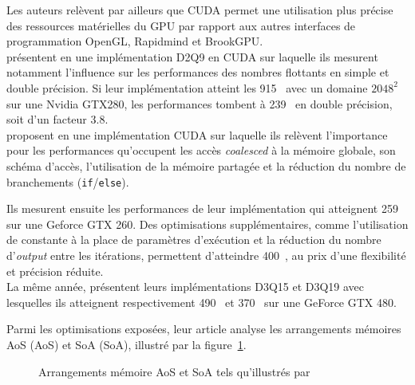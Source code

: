 Les auteurs relèvent par ailleurs que CUDA permet une utilisation plus précise des ressources matérielles du \acs{GPU} par rapport aux autres interfaces de programmation OpenGL, Rapidmind et BrookGPU.\\

\citet{kuznik_lbm_2010} présentent en \citeyear{kuznik_lbm_2010} une implémentation D2Q9 en CUDA sur laquelle ils mesurent notamment l'influence sur les performances des nombres flottants en simple et double précision. Si leur implémentation atteint les 915~  avec un domaine $2048^2$ sur une Nvidia GTX280, les performances tombent à 239~  en double précision, soit d'un facteur 3.8.\\

\citet{rinaldi_lattice-boltzmann_2012} proposent en \citeyear{rinaldi_lattice-boltzmann_2012} une implémentation CUDA sur laquelle ils relèvent l'importance pour les performances qu'occupent les accès \textit{coalesced} à la mémoire globale, son schéma d'accès, l'utilisation de la mémoire partagée et la réduction du nombre de branchements (\texttt{if}/\texttt{else}).

Ils mesurent ensuite les performances de leur implémentation qui atteignent 259~ sur une Geforce GTX 260. Des optimisations supplémentaires, comme l'utilisation de constante à la place de paramètres d'exécution et la réduction du nombre d'\textit{output} entre les itérations, permettent d'atteindre 400~, au prix d'une flexibilité et précision réduite.\\

La même année, \citet{astorino_modular_2012} présentent leurs implémentations D3Q15 et D3Q19 avec lesquelles ils atteignent respectivement 490~ et 370~ sur une GeForce GTX 480.

Parmi les optimisations exposées, leur article analyse les arrangements mémoires \acs{AoS} (\acl{AoS}) et \acs{SoA} (\acl{SoA}), illustré par la figure~\ref{fig:aos_soa}.

\begin{figure}[h]
	\centering
	\caption{Arrangements mémoire \acs{AoS} et \acs{SoA} tels qu'illustrés par \cite{astorino_modular_2012}}
	\label{fig:aos_soa}
\end{figure} 

